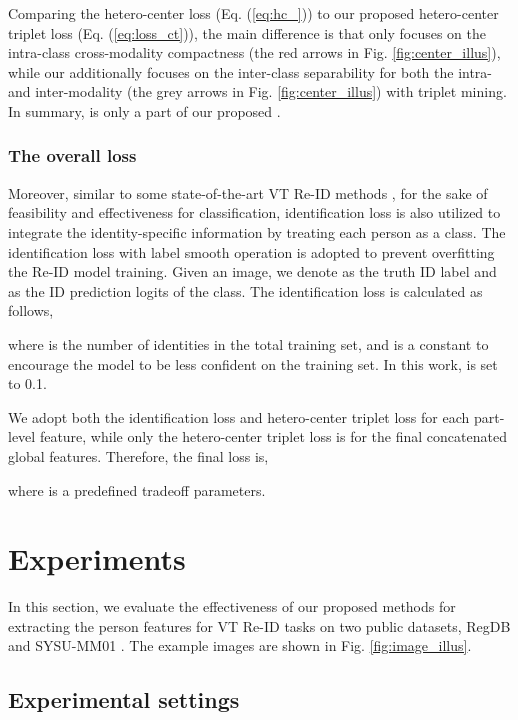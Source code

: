 \documentclass[journal]{IEEEtran}
\begin{document}
Comparing the hetero-center loss  (Eq. (\ref{eq:hc_})) to our proposed hetero-center triplet loss  (Eq. (\ref{eq:loss_ct})), the main difference is that  only focuses on the intra-class cross-modality compactness (the red arrows in Fig. \ref{fig:center_illus}), while our  additionally focuses on the inter-class separability for both the intra- and inter-modality (the grey arrows in Fig. \ref{fig:center_illus}) with triplet mining. In summary,  is only a part of our proposed .

\subsubsection{The overall loss}
Moreover, similar to some state-of-the-art VT Re-ID methods \cite{hao2019hsme,wang2019learning1,ye2018visible,tifs19vtreid,zhu2019hetero}, for the sake of feasibility and effectiveness for classification, identification loss is also utilized to integrate the identity-specific information by treating each person as a class.
The identification loss with label smooth operation is adopted to prevent overfitting the Re-ID model training. Given an image, we denote  as the truth ID label and  as the ID prediction logits of the  class. The identification loss is calculated as follows,

where  is the number of identities in the total training set, and  is a constant to encourage the model to be less confident on the training set. In this work,  is set to 0.1.

We adopt both the identification loss and hetero-center triplet loss for each part-level feature, while only the hetero-center triplet loss  is for the final concatenated global features. Therefore, the final loss is,

where  is a predefined tradeoff parameters.

\section{Experiments}
\label{sec:exp}
In this section, we evaluate the effectiveness of our proposed methods for extracting the person features for VT Re-ID tasks on two public datasets, RegDB \cite{nguyen2017person} and  SYSU-MM01 \cite{wu2017rgb}. The example images are shown in Fig. \ref{fig:image_illus}.
\subsection{Experimental settings}
\label{ssec:settings}
\end{document}
